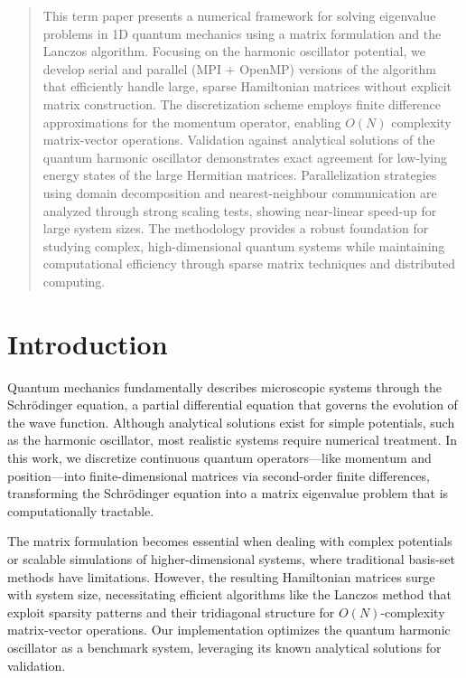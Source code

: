 \documentclass[12pt,a4paper]{report}
\begin{document}
\begin{abstract}
This term paper presents a numerical framework for solving eigenvalue problems in 1D quantum mechanics using a matrix formulation and the Lanczos algorithm. Focusing on the harmonic oscillator potential, we develop serial and parallel (MPI $+$ OpenMP) versions of the algorithm that efficiently handle large, sparse Hamiltonian matrices without explicit matrix construction. The discretization scheme employs finite difference approximations for the momentum operator, enabling $O(N)$ complexity matrix-vector operations. Validation against analytical solutions of the quantum harmonic oscillator demonstrates exact agreement for low-lying energy states of the large Hermitian matrices. Parallelization strategies using domain decomposition and nearest-neighbour communication are analyzed through strong scaling tests, showing near-linear speed-up for large system sizes. The methodology provides a robust foundation for studying complex, high-dimensional quantum systems while maintaining computational efficiency through sparse matrix techniques and distributed computing.
\end{abstract}


\tableofcontents
\newpage


\chapter{Introduction}
Quantum mechanics fundamentally describes microscopic systems through the Schrödinger equation, a partial differential equation that governs the evolution of the wave function. Although analytical solutions exist for simple potentials, such as the harmonic oscillator, most realistic systems require numerical treatment. In this work, we discretize continuous quantum operators—like momentum and position—into finite-dimensional matrices via second-order finite differences, transforming the Schrödinger equation into a matrix eigenvalue problem that is computationally tractable.

The matrix formulation becomes essential when dealing with complex potentials or scalable simulations of higher-dimensional systems, where traditional basis-set methods have limitations. However, the resulting Hamiltonian matrices surge with system size, necessitating efficient algorithms like the Lanczos method that exploit sparsity patterns and their tridiagonal structure for $O(N)$-complexity matrix-vector operations. Our implementation optimizes the quantum harmonic oscillator as a benchmark system, leveraging its known analytical solutions for validation.
\end{document}
